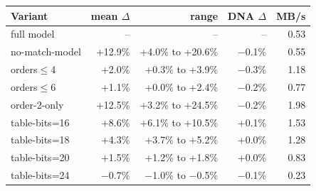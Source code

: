 \begin{tabular}{@{}lrrrr@{}}
\toprule
Variant & mean $\Delta$ & range & DNA $\Delta$ & MB/s \\
\midrule
full model & -- & -- & -- & 0.53 \\
\midrule
no-match-model & +12.9\% & +4.0\% to +20.6\% & $-$0.1\% & 0.55 \\
orders$\leq$4 & +2.0\% & +0.3\% to +3.9\% & $-$0.3\% & 1.18 \\
orders$\leq$6 & +1.1\% & +0.0\% to +2.4\% & $-$0.2\% & 0.77 \\
order-2-only & +12.5\% & +3.2\% to +24.5\% & $-$0.2\% & 1.98 \\
table-bits=16 & +8.6\% & +6.1\% to +10.5\% & +0.1\% & 1.53 \\
table-bits=18 & +4.3\% & +3.7\% to +5.2\% & +0.0\% & 1.28 \\
table-bits=20 & +1.5\% & +1.2\% to +1.8\% & +0.0\% & 0.83 \\
table-bits=24 & $-$0.7\% & $-$1.0\% to $-$0.5\% & $-$0.1\% & 0.23 \\
\bottomrule
\end{tabular}
